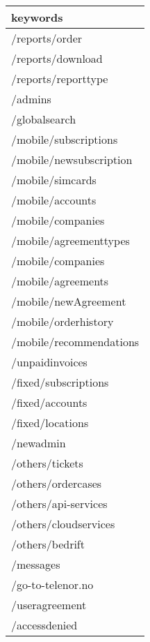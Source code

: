 \begin{tabular}{l}
\toprule
                keywords \\
\midrule
          /reports/order \\
       /reports/download \\
     /reports/reporttype \\
                 /admins \\
           /globalsearch \\
   /mobile/subscriptions \\
 /mobile/newsubscription \\
        /mobile/simcards \\
        /mobile/accounts \\
       /mobile/companies \\
  /mobile/agreementtypes \\
       /mobile/companies \\
      /mobile/agreements \\
    /mobile/newAgreement \\
    /mobile/orderhistory \\
 /mobile/recommendations \\
         /unpaidinvoices \\
    /fixed/subscriptions \\
         /fixed/accounts \\
        /fixed/locations \\
               /newadmin \\
         /others/tickets \\
      /others/ordercases \\
    /others/api-services \\
   /others/cloudservices \\
         /others/bedrift \\
               /messages \\
       /go-to-telenor.no \\
          /useragreement \\
           /accessdenied \\
\bottomrule
\end{tabular}
